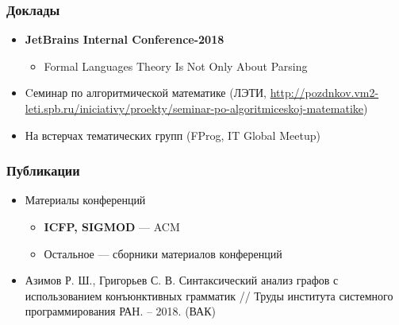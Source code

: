 \documentclass[xcolor=table]{beamer}
\begin{document}
\begin{frame}[fragile]
  \transwipe[direction=90]
  \frametitle{Доклады}
\begin{itemize}

      \item \textbf{JetBrains Internal Conference-2018}
      \begin{itemize}
        \item Formal Languages Theory Is Not Only About Parsing
      \end{itemize}

      \item Cеминар по алгоритмической математике (ЛЭТИ, \url{http://pozdnkov.vm2-leti.spb.ru/iniciativy/proekty/seminar-po-algoritmiceskoj-matematike})

      \item На встерчах тематических групп (FProg, IT Global Meetup)

\end{itemize}
\end{frame}


\begin{frame}[fragile]
  \transwipe[direction=90]
  \frametitle{Публикации}
\begin{itemize}
      \item Материалы конференций
        \begin{itemize}
          \item \textbf{ICFP, SIGMOD} --- ACM
          \item Остальное --- сборники материалов конференций
        \end{itemize}
      \item Азимов Р. Ш., Григорьев С. В. Синтаксический анализ графов с использованием конъюнктивных грамматик // Труды института системного программирования РАН. – 2018. (ВАК)
\end{itemize}
\end{frame}
\end{document}
